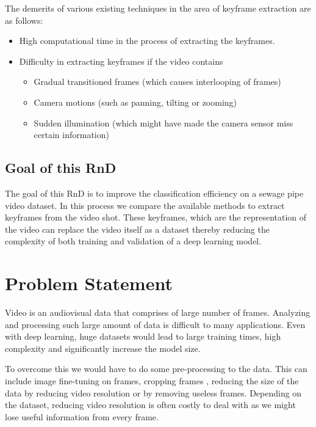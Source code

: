 \documentclass[rnd]{mas_proposal}
\begin{document}
The demerits of various existing techniques in the area of keyframe extraction are as follows:

\begin{itemize}
    \item High computational time in the process of extracting the keyframes.
    \item Difficulty in extracting keyframes if the video contains
    \begin{itemize}
        \item Gradual transitioned frames (which causes interlooping of frames)
        \item Camera motions (such as panning, tilting or zooming)
        \item Sudden illumination (which might have made the camera sensor miss certain information)
    \end{itemize}
\end{itemize}

\subsection{Goal of this RnD}
    
The goal of this RnD is to improve the classification efficiency on a sewage pipe video dataset. In this process we compare the available methods to extract keyframes from the video shot. These keyframes, which are the representation of the video can replace the video itself as a dataset thereby reducing the complexity of both training and validation of a deep learning model.

\section{Problem Statement}

Video is an audiovisual data that comprises of large number of frames. Analyzing and processing such large amount of data is difficult to many applications. Even with deep learning, huge datasets would lead to large training times, high complexity and significantly increase the model size.

To overcome this we would have to do some pre-processing to the data. This can include image fine-tuning on frames, cropping frames \cite{Gharahbagh2022}, reducing the size of the data by reducing video resolution or by removing useless frames. Depending on the dataset, reducing video resolution is often costly to deal with as we might lose useful information from every frame.
\end{document}
